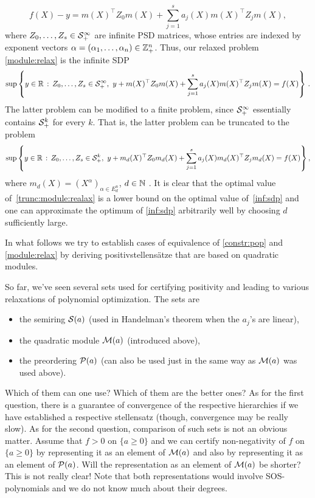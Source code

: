 \begin{equation}
 f(X) - y = m(X)^\top Z_0 m(X) + \sum_{j=1}^s a_j(X) m(X)^\top Z_j m(X),
 \label{eq:quadr:mod:conditions}
\end{equation} 
where $Z_0,\ldots,Z_s \in \mathcal{S}_+^\infty$ are infinite PSD matrices, whose entries are indexed by exponent vectors $\alpha = (\alpha_1,\ldots,\alpha_n) \in \mathbb{Z}_+^n$. Thus, our relaxed problem \eqref{module:relax} is the infinite SDP
\begin{equation}
	\label{inf:sdp}
	\sup \left\{ y \in \mathbb{R} \,:\, Z_0,\ldots,Z_s \in \mathcal{S}_+^\infty, \ y + m(X)^\top Z_0 m(X) + \sum_{j=1}^s a_j(X) m(X)^\top Z_j m(X) =f(X) \right\} \,.
\end{equation}
The latter problem can be modified to a finite problem, since $\mathcal{S}_+^\infty$ essentially contains $\mathcal{S}_+^k$ for every $k$. That is, the latter problem can be truncated to the problem 
\begin{equation}
	\label{trunc:module:realax}
	\sup \left\{ y \in \mathbb{R} \,:\, Z_0,\ldots,Z_s \in \mathcal{S}_+^k, \ y + m_d(X)^\top Z_0 m_d(X) + \sum_{j=1}^s a_j(X) m_d(X)^\top Z_j m_d(X) = f(X) \right\},
\end{equation}
where $m_d(X) = (X^\alpha)_{\alpha \in E_d^n}$, $d \in \mathbb{N}$ . It is clear that the optimal value of~\eqref{trunc:module:realax} is a lower bound on the optimal value of~\eqref{inf:sdp} and one can approximate the optimum of \eqref{inf:sdp} arbitrarily well by choosing $d$ sufficiently large.

In what follows we try to establish cases of equivalence of \eqref{constr:pop} and \eqref{module:relax} by deriving positivstellensätze that are based on quadratic modules. 

\begin{remark}
	So far, we've seen several sets used for certifying positivity and leading to various relaxations of polynomial optimization. The sets are 
	\begin{itemize}
		\item the semiring $\mathcal{S}(a)$ (used in Handelman's theorem when the $a_j$'s are linear),
		\item the quadratic module $\mathcal{M}(a)$ (introduced above),
		\item the preordering $\mathcal{P}(a)$ (can also be used just in the same way as $\mathcal{M}(a)$ was used above). 
	\end{itemize}
	Which of them can one use? Which of them are the better ones? As for the first question, there is a guarantee of convergence of the respective hierarchies if we have established a respective stellensatz (though, convergence may be really slow). As for the second question, comparison of such sets is not an obvious matter. Assume that $f>0$ on $\{a \ge 0\}$ and we can certify non-negativity of $f$ on $\{a \ge 0\}$ by representing it as an element of $\mathcal{M}(a)$ and also by representing it as an element of $\mathcal{P}(a)$. Will the representation as an element of $\mathcal{M}(a)$ be shorter? This is not really clear! Note that both representations would involve SOS-polynomials and we do not know much about their degrees. 
\end{remark}


